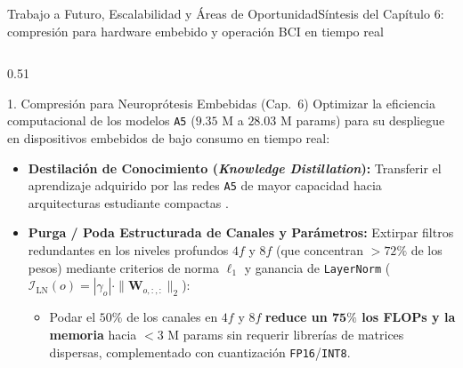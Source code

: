 \begin{frame}{Trabajo a Futuro, Escalabilidad y \'Areas de Oportunidad}{S\'intesis del Cap\'itulo 6: compresi\'on para hardware embebido y operaci\'on BCI en tiempo real \cite{Xie2026,wang2025dtcnet,rodas_valencia_tpe_ecog}}
  \begin{columns}[T,onlytextwidth]
    \begin{column}{0.51\textwidth}
      \scriptsize
      \begin{alertblock}{1. Compresi\'on para Neuropr\'otesis Embebidas (Cap.\ 6)}
        Optimizar la eficiencia computacional de los modelos \texttt{A5} ($9.35\text{ M}$ a $28.03\text{ M}$ params) para su despliegue en dispositivos embebidos de bajo consumo en tiempo real:
        \begin{itemize}\setlength{\itemsep}{2.5pt}
          \item \textbf{Destilaci\'on de Conocimiento (\textit{Knowledge Distillation}):} Transferir el aprendizaje adquirido por las redes \texttt{A5} de mayor capacidad hacia arquitecturas estudiante compactas \cite{Xie2026}.
          \item \textbf{Purga / Poda Estructurada de Canales y Par\'ametros:} Extirpar filtros redundantes en los niveles profundos $4f$ y $8f$ (que concentran $>72\%$ de los pesos) mediante criterios de norma $\ell_1$ y ganancia de \texttt{LayerNorm} ($\mathcal{I}_{\text{LN}}(o) = |\gamma_o|\cdot\|\mathbf{W}_{o,:,:}\|_2$):
            \begin{itemize}\tiny
              \item Podar el $50\%$ de los canales en $4f$ y $8f$ \textbf{reduce un $\mathbf{75\%}$ los FLOPs y la memoria} hacia $<3\text{ M}$ params sin requerir librer\'ias de matrices dispersas, complementado con cuantizaci\'on \texttt{FP16}/\texttt{INT8}.
            \end{itemize}
        \end{itemize}
      \end{alertblock}
    \end{column}


\end{columns}
\end{frame}
